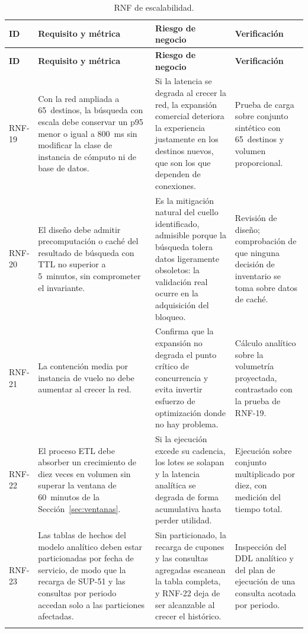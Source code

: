 \documentclass[10pt,letterpaper]{article}
\begin{document}
\begin{longtable}{@{}L{1.5cm} L{5.0cm} L{4.6cm} L{4.9cm}@{}}
\toprule \textbf{ID} & \textbf{Requisito y métrica} & \textbf{Riesgo de negocio} & \textbf{Verificación} \\ \midrule \endfirsthead
\toprule \textbf{ID} & \textbf{Requisito y métrica} & \textbf{Riesgo de negocio} & \textbf{Verificación} \\ \midrule \endhead
RNF-19 & Con la red ampliada a 65~destinos, la búsqueda con escala debe conservar un p95 menor o igual a 800~ms sin modificar la clase de instancia de cómputo ni de base de datos. & Si la latencia se degrada al crecer la red, la expansión comercial deteriora la experiencia justamente en los destinos nuevos, que son los que dependen de conexiones. & Prueba de carga sobre conjunto sintético con 65~destinos y volumen proporcional. \\
RNF-20 & El diseño debe admitir precomputación o caché del resultado de búsqueda con TTL no superior a 5~minutos, sin comprometer el invariante. & Es la mitigación natural del cuello identificado, admisible porque la búsqueda tolera datos ligeramente obsoletos: la validación real ocurre en la adquisición del bloqueo. & Revisión de diseño; comprobación de que ninguna decisión de inventario se toma sobre datos de caché. \\
RNF-21 & La contención media por instancia de vuelo no debe aumentar al crecer la red. & Confirma que la expansión no degrada el punto crítico de concurrencia y evita invertir esfuerzo de optimización donde no hay problema. & Cálculo analítico sobre la volumetría proyectada, contrastado con la prueba de RNF-19. \\
RNF-22 & El proceso ETL debe absorber un crecimiento de diez veces en volumen sin superar la ventana de 60~minutos de la Sección~\ref{sec:ventanas}. & Si la ejecución excede su cadencia, los lotes se solapan y la latencia analítica se degrada de forma acumulativa hasta perder utilidad. & Ejecución sobre conjunto multiplicado por diez, con medición del tiempo total. \\
RNF-23 & Las tablas de hechos del modelo analítico deben estar particionadas por fecha de servicio, de modo que la recarga de SUP-51 y las consultas por periodo accedan solo a las particiones afectadas. & Sin particionado, la recarga de cupones y las consultas agregadas escanean la tabla completa, y RNF-22 deja de ser alcanzable al crecer el histórico. & Inspección del DDL analítico y del plan de ejecución de una consulta acotada por periodo. \\
\bottomrule
\caption{RNF de escalabilidad.}
\end{longtable}
\end{document}
